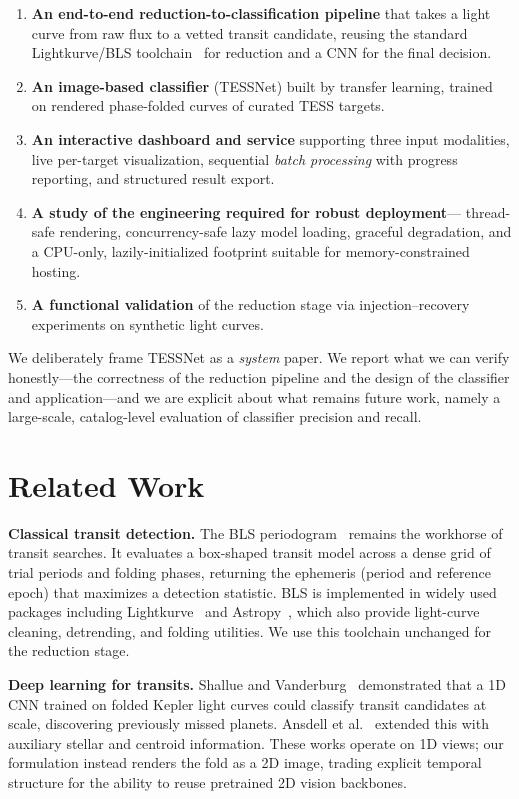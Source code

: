 \documentclass[twocolumn,10pt]{article}
\begin{document}
\begin{enumerate}
  \item \textbf{An end-to-end reduction-to-classification pipeline} that takes a
  light curve from raw flux to a vetted transit candidate, reusing the standard
  Lightkurve/BLS toolchain~\cite{lightkurve2018} for reduction and a CNN for the
  final decision.
  \item \textbf{An image-based classifier} (TESSNet) built by transfer learning,
  trained on rendered phase-folded curves of curated TESS targets.
  \item \textbf{An interactive dashboard and service} supporting three input
  modalities, live per-target visualization, sequential \emph{batch processing}
  with progress reporting, and structured result export.
  \item \textbf{A study of the engineering required for robust deployment}---
  thread-safe rendering, concurrency-safe lazy model loading, graceful
  degradation, and a CPU-only, lazily-initialized footprint suitable for
  memory-constrained hosting.
  \item \textbf{A functional validation} of the reduction stage via
  injection--recovery experiments on synthetic light curves.
\end{enumerate}

We deliberately frame TESSNet as a \emph{system} paper. We report what we can
verify honestly---the correctness of the reduction pipeline and the design of the
classifier and application---and we are explicit about what remains future work,
namely a large-scale, catalog-level evaluation of classifier precision and recall.

\section{Related Work}
\textbf{Classical transit detection.} The BLS periodogram~\cite{kovacs2002}
remains the workhorse of transit searches. It evaluates a box-shaped transit model
across a dense grid of trial periods and folding phases, returning the ephemeris
(period and reference epoch) that maximizes a detection statistic. BLS is
implemented in widely used packages including Lightkurve~\cite{lightkurve2018} and
Astropy~\cite{astropy2018}, which also provide light-curve cleaning, detrending,
and folding utilities. We use this toolchain unchanged for the reduction stage.

\textbf{Deep learning for transits.} Shallue and Vanderburg~\cite{shallue2018}
demonstrated that a 1D CNN trained on folded Kepler light curves could classify
transit candidates at scale, discovering previously missed planets. Ansdell et
al.~\cite{ansdell2018} extended this with auxiliary stellar and centroid
information. These works operate on 1D views;
our formulation instead renders the fold as a 2D image, trading explicit temporal
structure for the ability to reuse pretrained 2D vision backbones.
\end{document}
